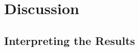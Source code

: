 %
%
%
%
%
%
%
%

\chapter{Discussion}
\label{chap:discussion}

\section{Interpreting the Results}
\label{sec:interpretation}

%
%
%


